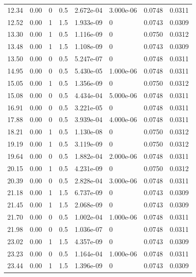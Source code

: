 \documentclass[preview]{standalone}
\begin{document}
{{\begin{tabular}{L{1.2cm}C{1.2cm} C{0.3cm}C{0.5cm} C{1.4cm}C{1.4cm} C{1.4cm}C{1.4cm}}
  12.34  &  0.00  & 0     & 0.5 &  2.672e-04  & 3.000e-06  & 0.0748 &  0.0311   \\ 
  12.52  &  0.00  & 1     & 1.5 &  1.933e-09  & 0  & 0.0743 &  0.0309   \\ 
  13.30  &  0.00  & 1     & 0.5 &  1.116e-09  & 0  & 0.0750 &  0.0312   \\ 
  13.48  &  0.00  & 1     & 1.5 &  1.108e-09  & 0  & 0.0743 &  0.0309   \\ 
  13.50  &  0.00  & 0     & 0.5 &  5.247e-07  & 0  & 0.0748 &  0.0311   \\ 
  14.95  &  0.00  & 0     & 0.5 &  5.430e-05  & 1.000e-06  & 0.0748 &  0.0311   \\ 
  15.05  &  0.00  & 1     & 0.5 &  1.356e-09  & 0  & 0.0750 &  0.0312   \\ 
  15.08  &  0.00  & 0     & 0.5 &  4.434e-04  & 5.000e-06  & 0.0748 &  0.0311   \\ 
  16.91  &  0.00  & 0     & 0.5 &  3.221e-05  & 0  & 0.0748 &  0.0311   \\ 
  17.88  &  0.00  & 0     & 0.5 &  3.939e-04  & 4.000e-06  & 0.0748 &  0.0311   \\ 
  18.21  &  0.00  & 1     & 0.5 &  1.130e-08  & 0  & 0.0750 &  0.0312   \\ 
  19.19  &  0.00  & 1     & 0.5 &  3.119e-09  & 0  & 0.0750 &  0.0312   \\ 
  19.64  &  0.00  & 0     & 0.5 &  1.882e-04  & 2.000e-06  & 0.0748 &  0.0311   \\ 
  20.15  &  0.00  & 1     & 0.5 &  4.231e-09  & 0  & 0.0750 &  0.0312   \\ 
  20.39  &  0.00  & 0     & 0.5 &  2.828e-04  & 3.000e-06  & 0.0748 &  0.0311   \\ 
  21.18  &  0.00  & 1     & 1.5 &  6.737e-09  & 0  & 0.0743 &  0.0309   \\ 
  21.45  &  0.00  & 1     & 1.5 &  2.068e-09  & 0  & 0.0743 &  0.0309   \\ 
  21.70  &  0.00  & 0     & 0.5 &  1.002e-04  & 1.000e-06  & 0.0748 &  0.0311   \\ 
  21.98  &  0.00  & 0     & 0.5 &  1.036e-07  & 0  & 0.0748 &  0.0311   \\ 
  23.02  &  0.00  & 1     & 1.5 &  4.357e-09  & 0  & 0.0743 &  0.0309   \\ 
  23.23  &  0.00  & 0     & 0.5 &  1.164e-04  & 1.000e-06  & 0.0748 &  0.0311   \\ 
  23.44  &  0.00  & 1     & 1.5 &  1.396e-09  & 0  & 0.0743 &  0.0309   \\ 

\end{tabular}}}
\end{document}
